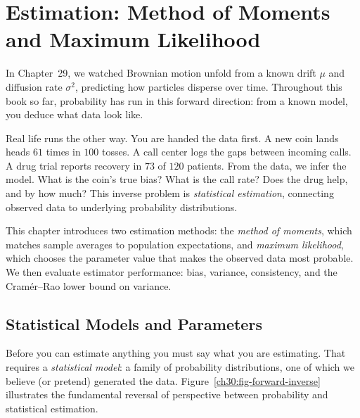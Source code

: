 \chapter{Estimation: Method of Moments and Maximum Likelihood}

In Chapter~29, we watched Brownian motion unfold from a known drift $\mu$
and diffusion rate $\sigma^2$, predicting how particles disperse over time.
Throughout this book so far, probability has run in this forward direction:
from a known model, you deduce what data look like.

Real life runs the other way. You are handed the data first. A new coin lands
heads $61$ times in $100$ tosses. A call center logs the gaps between incoming
calls. A drug trial reports recovery in $73$ of $120$ patients. From the data,
we infer the model. What is the coin's true bias?
What is the call rate? Does the drug help, and by how much? This inverse
problem is \emph{statistical estimation}, connecting observed data to
underlying probability distributions.

This chapter introduces two estimation methods:
the \emph{method of moments}, which matches sample averages to population expectations,
and \emph{maximum likelihood}, which chooses the parameter value that makes the observed data
most probable. We then evaluate estimator performance: bias, variance, consistency, and the Cram\'er--Rao lower bound on variance.

\chapterline

\section{Statistical Models and Parameters}
\label{ch30:models}

Before you can estimate anything you must say what you are estimating. That
requires a \emph{statistical model}: a family of probability distributions, one
of which we believe (or pretend) generated the data. Figure~\ref{ch30:fig-forward-inverse}
illustrates the fundamental reversal of perspective between probability and
statistical estimation.

